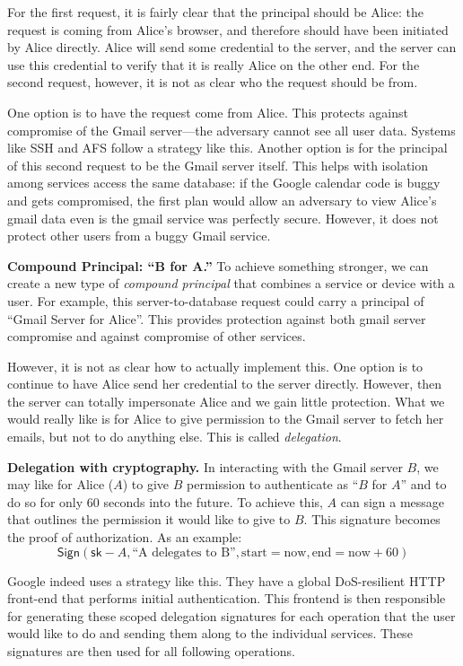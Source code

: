 \documentclass[
  letterpaper,
]{scrbook}
\newcommand{\Sign}{\mathsf{Sign}}
\newcommand{\sk}{\mathsf{sk}}
\theoremstyle{definition}
\theoremstyle{plain}
\theoremstyle{plain}
\theoremstyle{remark}
\begin{document}
For the first request, it is fairly clear that the principal should be
Alice: the request is coming from Alice's browser, and therefore should
have been initiated by Alice directly. Alice will send some credential
to the server, and the server can use this credential to verify that it
is really Alice on the other end. For the second request, however, it is
not as clear who the request should be from.

One option is to have the request come from Alice. This protects against
compromise of the Gmail server---the adversary cannot see all user data.
Systems like SSH and AFS follow a strategy like this. Another option is
for the principal of this second request to be the Gmail server itself.
This helps with isolation among services access the same database: if
the Google calendar code is buggy and gets compromised, the first plan
would allow an adversary to view Alice's gmail data even is the gmail
service was perfectly secure. However, it does not protect other users
from a buggy Gmail service.

\textbf{Compound Principal: ``B for A.''} To achieve something stronger,
we can create a new type of \emph{compound principal} that combines a
service or device with a user. For example, this server-to-database
request could carry a principal of ``Gmail Server for Alice''. This
provides protection against both gmail server compromise and against
compromise of other services.

However, it is not as clear how to actually implement this. One option
is to continue to have Alice send her credential to the server directly.
However, then the server can totally impersonate Alice and we gain
little protection. What we would really like is for Alice to give
permission to the Gmail server to fetch her emails, but not to do
anything else. This is called \emph{delegation}.

\textbf{Delegation with cryptography.} In interacting with the Gmail
server \(B\), we may like for Alice (\(A\)) to give \(B\) permission to
authenticate as ``\(B\) for \(A\)'' and to do so for only 60 seconds
into the future. To achieve this, \(A\) can sign a message that outlines
the permission it would like to give to \(B\). This signature becomes
the proof of authorization. As an example:
\[ \Sign(\sk-A, \text{“A delegates to B”}, \text{start}=\text{now}, \text{end}=\text{now}+60) \]

Google indeed uses a strategy like this. They have a global
DoS-resilient HTTP front-end that performs initial authentication. This
frontend is then responsible for generating these scoped delegation
signatures for each operation that the user would like to do and sending
them along to the individual services. These signatures are then used
for all following operations.
\end{document}
